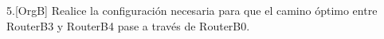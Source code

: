\begin{ejer}
5.[OrgB]  Realice la configuración necesaria para que el camino óptimo entre RouterB3 y RouterB4 pase a través de RouterB0.
\end{ejer}